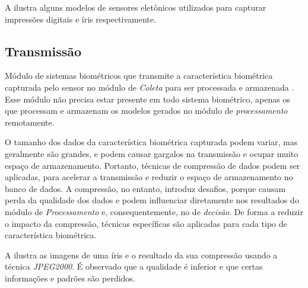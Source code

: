 \par A  ilustra alguns modelos de sensores eletônicos utilizados para capturar impressões digitais e íris respectivamente.


\FloatBarrier

\subsection{Transmissão}\label{sec:sis_bio:transmissao}

\par Módulo de sistemas biométricos que transmite a característica biométrica capturada pelo sensor no módulo de \textit{Coleta} para ser processada e armazenada \cite{wayman2005biometric}. Esse módulo não precisa estar presente em todo sistema biométrico, apenas os que processam e armazenam os modelos gerados no módulo de \textit{processamento} remotamente.

\par O tamanho dos dados da característica biométrica capturada podem variar, mas geralmente são grandes, e podem causar gargalos na transmissão e ocupar muito espaço de armazenamento. Portanto, técnicas de compressão de dados podem ser aplicadas, para acelerar a transmissão e reduzir o espaço de armazenamento no banco de dados. A compressão, no entanto, introduz desafios, porque causam perda da qualidade dos dados e podem influenciar diretamente nos resultados do módulo de \textit{Processamento} e, consequentemente, no de \textit{decisão}. De forma a reduzir o impacto da compressão, técnicas específicas são aplicadas para cada tipo de característica biométrica.

\par A  ilustra as imagens de uma íris e o resultado da sua compressão usando a técnica \textit{JPEG2000}. É observado que a qualidade é inferior e que certas informações e padrões são perdidos.


